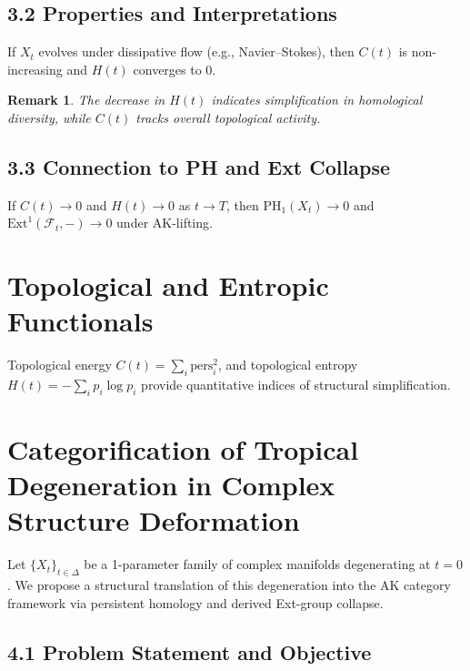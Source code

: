 \documentclass[11pt]{article}
\newtheorem{remark}[theorem]{Remark}
\begin{document}
\subsection{3.2 Properties and Interpretations}

\begin{lemma}
If $X_t$ evolves under dissipative flow (e.g., Navier–Stokes), then $C(t)$ is non-increasing and $H(t)$ converges to 0.
\end{lemma}

\begin{remark}
The decrease in $H(t)$ indicates simplification in homological diversity, while $C(t)$ tracks overall topological activity.
\end{remark}

\subsection{3.3 Connection to PH and Ext Collapse}

\begin{proposition}
If $C(t) \to 0$ and $H(t) \to 0$ as $t \to T$, then $\mathrm{PH}_1(X_t) \to 0$ and $\mathrm{Ext}^1(\mathcal{F}_t, -) \to 0$ under AK-lifting.
\end{proposition}
\section{Topological and Entropic Functionals}
Topological energy \( C(t) = \sum_i \text{pers}_i^2 \), and topological entropy \( H(t) = -\sum_i p_i \log p_i \) provide quantitative indices of structural simplification.




\section{Categorification of Tropical Degeneration in Complex Structure Deformation}

Let \( \{X_t\}_{t \in \Delta} \) be a 1-parameter family of complex manifolds degenerating at \( t=0 \).  
We propose a structural translation of this degeneration into the AK category framework via persistent homology and derived Ext-group collapse.

\subsection{4.1 Problem Statement and Objective}
\end{document}
